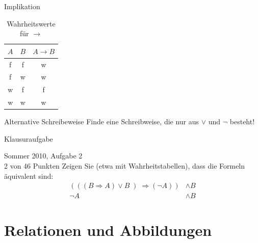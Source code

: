     \begin{frame}{Implikation}
        \begin{table}
            \caption{Wahrheitswerte für $\rightarrow$}
            \begin{center}
                \begin{tabular}{ccc}
                    \toprule
                    $A$ & $B$ & $A \rightarrow B$\\
                    \midrule
                    f & f & w\\
                    f & w & w\\
                    w & f & f\\
                    w & w & w\\
                    \bottomrule
                \end{tabular}
             \end{center}
        \end{table}
        \pause
        \begin{exampleblock}{Alternative Schreibeweise}
            Finde eine Schreibweise, die nur aus $\vee$ und $\neg$ besteht!\\
            \pause
        \end{exampleblock}
    \end{frame}

    \begin{frame}{Klausuraufgabe}
        \begin{exampleblock}{Sommer 2010, Aufgabe 2\\ 2 von 46 Punkten}
            Zeigen Sie (etwa mit Wahrheitstabellen), dass die Formeln äquivalent sind:
            \begin{align*}
                \left(\left(\left( B \Rightarrow A\right)\vee B\left) \Rightarrow \left(\neg A\right)\right) &\wedge B\\
                \neg A &\wedge B
            \end{align*}
        \end{exampleblock}
    \end{frame}

\section{Relationen und Abbildungen}
